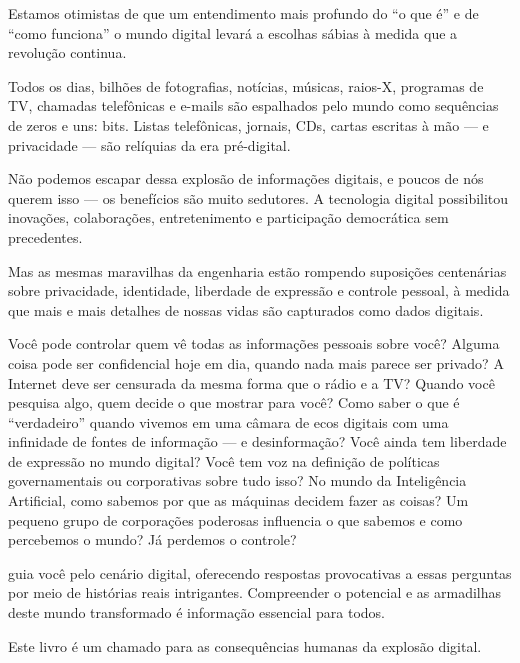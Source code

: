 Estamos otimistas de que um entendimento mais profundo do ``o que é'' e de
``como funciona'' o mundo digital levará a escolhas sábias à medida que a
revolução continua.

Todos os dias, bilhões de fotografias, notícias, músicas, raios-X, programas de
TV, chamadas telefônicas e e-mails são espalhados pelo mundo como sequências de
zeros e uns: bits. Listas telefônicas, jornais, CDs, cartas escritas à mão --- e
privacidade --- são relíquias da era pré-digital.

Não podemos escapar dessa explosão de informações digitais, e poucos de nós
querem isso --- os benefícios são muito sedutores. A tecnologia digital
possibilitou inovações, colaborações, entretenimento e participação democrática
sem precedentes.

Mas as mesmas maravilhas da engenharia estão rompendo suposições centenárias
sobre privacidade, identidade, liberdade de expressão e controle pessoal, à
medida que mais e mais detalhes de nossas vidas são capturados como dados
digitais.

Você pode controlar quem vê todas as informações pessoais sobre você? Alguma
coisa pode ser confidencial hoje em dia, quando nada mais parece ser privado? A
Internet deve ser censurada da mesma forma que o rádio e a TV? Quando você
pesquisa algo, quem decide o que mostrar para você? Como saber o que é
``verdadeiro'' quando vivemos em uma câmara de ecos digitais com uma infinidade
de fontes de informação --- e desinformação? Você ainda tem liberdade de
expressão no mundo digital? Você tem voz na definição de políticas
governamentais ou corporativas sobre tudo isso? No mundo da 
Inteligência Artificial, como sabemos por que as máquinas decidem fazer as
coisas? Um pequeno grupo de corporações poderosas influencia o que sabemos e
como percebemos o mundo? Já perdemos o controle?

 guia você pelo cenário digital, oferecendo respostas
provocativas a essas perguntas por meio de histórias reais
intrigantes. Compreender o potencial e as armadilhas deste mundo transformado é
informação essencial para todos.

Este livro é um chamado para as consequências humanas da explosão digital.
